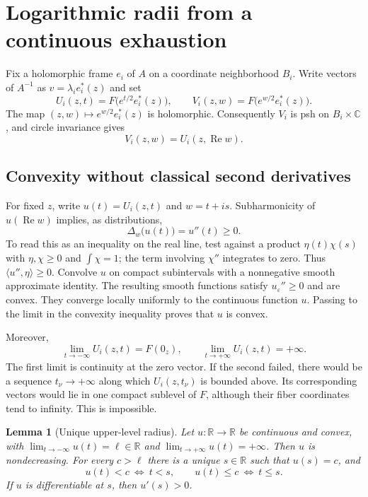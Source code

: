 \documentclass[11pt]{amsart}
\newtheorem{lemma}[theorem]{Lemma}
\theoremstyle{definition}
\theoremstyle{remark}
\numberwithin{equation}{section}
\newcommand{\C}{\mathbb C}
\newcommand{\R}{\mathbb R}
\begin{document}
\section{Logarithmic radii from a continuous exhaustion}

Fix a holomorphic frame $e_i$ of $A$ on a coordinate neighborhood
$B_i$. Write vectors of $A^{-1}$ as $v=\lambda_i e_i^*(z)$ and set
\begin{equation}\label{eq:UV}
U_i(z,t)=F\bigl(e^{t/2}e_i^*(z)\bigr),\qquad
V_i(z,w)=F\bigl(e^{w/2}e_i^*(z)\bigr).
\end{equation}
The map $(z,w)\mapsto e^{w/2}e_i^*(z)$ is holomorphic. Consequently
$V_i$ is psh on $B_i\times\C$, and circle invariance gives
\begin{equation}\label{eq:real-part}
V_i(z,w)=U_i(z,\operatorname{Re}w).
\end{equation}

\subsection{Convexity without classical second derivatives}

For fixed $z$, write $u(t)=U_i(z,t)$ and $w=t+is$.
Subharmonicity of $u(\operatorname{Re}w)$ implies, as distributions,
\[
\Delta_w\bigl(u(t)\bigr)=u''(t)\ge0.
\]
To read this as an inequality on the real line, test against a product
$\eta(t)\chi(s)$ with $\eta,\chi\ge0$ and $\int\chi=1$; the term
involving $\chi''$ integrates to zero. Thus
$\langle u'',\eta\rangle\ge0$.
Convolve $u$ on compact subintervals with a nonnegative smooth
approximate identity. The resulting smooth functions satisfy
$u_\varepsilon''\ge0$ and are convex. They converge locally uniformly
to the continuous function $u$. Passing to the limit in the convexity
inequality proves that $u$ is convex.

Moreover,
\begin{equation}\label{eq:limits}
\lim_{t\to-\infty}U_i(z,t)=F(0_z),\qquad
\lim_{t\to+\infty}U_i(z,t)=+\infty.
\end{equation}
The first limit is continuity at the zero vector. If the second failed,
there would be a sequence $t_\nu\to+\infty$ along which $U_i(z,t_\nu)$
is bounded above. Its corresponding vectors would lie in one compact
sublevel of $F$, although their fiber coordinates tend to infinity.
This is impossible.

\begin{lemma}[Unique upper-level radius]\label{lem:convex}
Let $u:\R\to\R$ be continuous and convex, with
$\lim_{t\to-\infty}u(t)=\ell\in\R$ and
$\lim_{t\to+\infty}u(t)=+\infty$. Then $u$ is nondecreasing.
For every $c>\ell$ there is a unique $s\in\R$ such that $u(s)=c$,
and
\[
u(t)<c\ \Longleftrightarrow\ t<s,\qquad
u(t)\le c\ \Longleftrightarrow\ t\le s.
\]
If $u$ is differentiable at $s$, then $u'(s)>0$.
\end{lemma}
\end{document}
